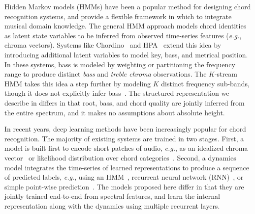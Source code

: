 \documentclass{article}
\def\eg{\emph{e.g.}}
\begin{document}
Hidden Markov models (HMMs) have been a popular method for designing chord recognition systems, and provide a flexible framework in which to integrate musical domain knowledge.
The general HMM approach models chord identities as latent state variables to be inferred from observed time-series features (\eg, chroma vectors).
Systems like Chordino~\cite{matthias2010a} and HPA~\cite{ni2012end} extend this idea by introducing additional latent variables to model key, bass, and metrical position.
In these systems, bass is modeled by weighting or partitioning the frequency range to produce distinct \emph{bass} and \emph{treble chroma} observations.
The $K$-stream HMM takes this idea a step further by modeling $K$ distinct frequency sub-bands, though it does not explicitly infer bass~\cite{cho2014improved}.
The structured representation we describe in  differs in that root, bass, and chord quality are jointly inferred from the entire spectrum, and it makes no assumptions about absolute height.



%   

In recent years, deep learning methods have been increasingly popular for chord recognition.
The majority of existing systems are trained in two stages. 
First, a model is built first to encode short patches of audio, \eg, as an idealized chroma vector~\cite{boulanger2013audio,korzeniowski2016feature} or likelihood distribution over chord categories~\cite{humphrey2015four,sigtia2015audio,zhou2015chord,deng2016hybrid}.
Second, a dynamics model integrates the time-series of learned representations to produce a sequence of predicted labels, \eg, using an HMM~\cite{humphrey2015four,zhou2015chord}, recurrent neural network (RNN)~\cite{boulanger2013audio,sigtia2015audio}, or simple point-wise prediction~\cite{korzeniowski2016feature}.
The models proposed here differ in that they are jointly trained end-to-end from spectral features, and learn the internal representation along with the dynamics using multiple recurrent layers.
\end{document}
